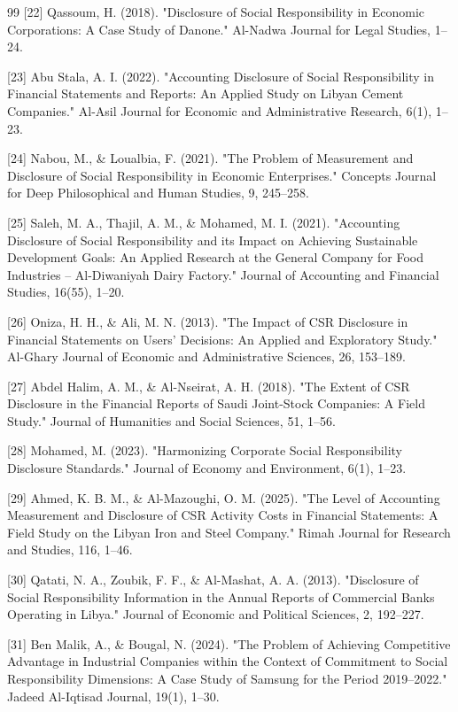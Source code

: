 \documentclass{default}
\begin{document}
\begin{thebibliography}{99}
[22] Qassoum, H. (2018). "Disclosure of Social Responsibility in Economic Corporations: A Case Study of Danone." Al-Nadwa Journal for Legal Studies, 1–24.

[23] Abu Stala, A. I. (2022). "Accounting Disclosure of Social Responsibility in Financial Statements and Reports: An Applied Study on Libyan Cement Companies." Al-Asil Journal for Economic and Administrative Research, 6(1), 1–23.

[24] Nabou, M., \& Loualbia, F. (2021). "The Problem of Measurement and Disclosure of Social Responsibility in Economic Enterprises." Concepts Journal for Deep Philosophical and Human Studies, 9, 245–258.

[25] Saleh, M. A., Thajil, A. M., \& Mohamed, M. I. (2021). "Accounting Disclosure of Social Responsibility and its Impact on Achieving Sustainable Development Goals: An Applied Research at the General Company for Food Industries – Al-Diwaniyah Dairy Factory." Journal of Accounting and Financial Studies, 16(55), 1–20.

[26] Oniza, H. H., \& Ali, M. N. (2013). "The Impact of CSR Disclosure in Financial Statements on Users' Decisions: An Applied and Exploratory Study." Al-Ghary Journal of Economic and Administrative Sciences, 26, 153–189.

[27] Abdel Halim, A. M., \& Al-Nseirat, A. H. (2018). "The Extent of CSR Disclosure in the Financial Reports of Saudi Joint-Stock Companies: A Field Study." Journal of Humanities and Social Sciences, 51, 1–56.

[28] Mohamed, M. (2023). "Harmonizing Corporate Social Responsibility Disclosure Standards." Journal of Economy and Environment, 6(1), 1–23.

[29] Ahmed, K. B. M., \& Al-Mazoughi, O. M. (2025). "The Level of Accounting Measurement and Disclosure of CSR Activity Costs in Financial Statements: A Field Study on the Libyan Iron and Steel Company." Rimah Journal for Research and Studies, 116, 1–46.

[30] Qatati, N. A., Zoubik, F. F., \& Al-Mashat, A. A. (2013). "Disclosure of Social Responsibility Information in the Annual Reports of Commercial Banks Operating in Libya." Journal of Economic and Political Sciences, 2, 192–227.

[31] Ben Malik, A., \& Bougal, N. (2024). "The Problem of Achieving Competitive Advantage in Industrial Companies within the Context of Commitment to Social Responsibility Dimensions: A Case Study of Samsung for the Period 2019–2022." Jadeed Al-Iqtisad Journal, 19(1), 1–30.


\end{thebibliography}
\end{document}
